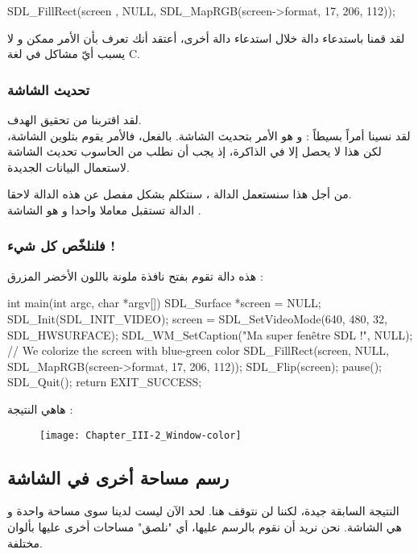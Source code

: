 \begin{Csource}
SDL_FillRect(screen , NULL, SDL_MapRGB(screen->format, 17, 206, 112));
\end{Csource}

لقد قمنا باستدعاء دالة خلال استدعاء دالة أخرى، أعتقد أنك تعرف بأن الأمر ممكن و لا يسبب أيّ مشاكل في لغة
\textenglish{C}.

\subsubsection{تحديث الشاشة}

لقد اقتربنا من تحقيق الهدف.\\
لقد نسينا أمراً بسيطاً : و هو الأمر بتحديث الشاشة. بالفعل، فالأمر 
يقوم بتلوين الشاشة، لكن هذا لا يحصل إلا في الذاكرة، إذ يجب أن نطلب من الحاسوب تحديث الشاشة لاستعمال البيانات الجديدة.

من أجل هذا سنستعمل الدالة 
،
سنتكلم بشكل مفصل عن هذه الدالة لاحقا.\\
الدالة تستقبل معاملا واحدا و هو الشاشة
.

\subsubsection{فلنلخّص كل شيء !}

هذه دالة
تقوم بفتح نافذة ملونة باللون الأخضر المزرق :

\begin{Csource}
int main(int argc, char *argv[])
{
	SDL_Surface *screen = NULL;
	SDL_Init(SDL_INIT_VIDEO);
	screen = SDL_SetVideoMode(640, 480, 32, SDL_HWSURFACE);
	SDL_WM_SetCaption("Ma super fenêtre SDL !", NULL);
	// We colorize the screen with blue-green color
	SDL_FillRect(screen, NULL, SDL_MapRGB(screen->format, 17, 206, 112));
	SDL_Flip(screen); 
	pause();
	SDL_Quit();
	return EXIT_SUCCESS;
}
\end{Csource}

هاهي النتيجة :

\begin{figure}[H]
	\centering
	\texttt{[image: Chapter\_III-2\_Window-color]}
\end{figure}

\subsection{رسم مساحة أخرى في الشاشة}

النتيجة السابقة جيدة، لكننا لن نتوقف هنا. لحد الآن ليست لدينا سوى مساحة واحدة و هي الشاشة. نحن نريد أن نقوم بالرسم عليها، أي "نلصق" مساحات أخرى عليها بألوان مختلفة.

